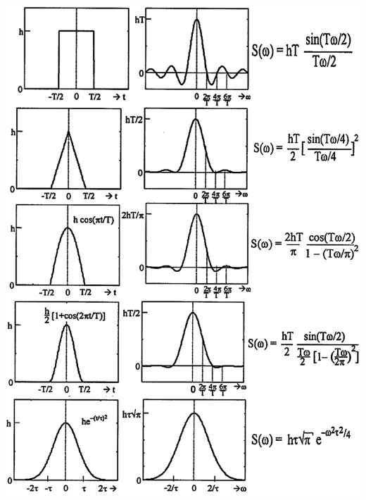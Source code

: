 \begin{landscape}

\begin{minipage}{7cm}
\includegraphics[width=\textwidth,trim= 0cm 0cm 0cm 0cm]{bilder/Transformationen/Fourier-Trafo.png}


\end{minipage}
\end{landscape}

